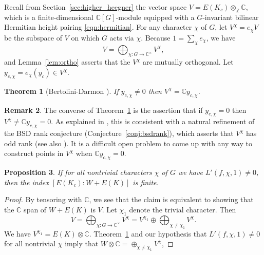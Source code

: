 \documentclass[preprint,12pt]{elsarticle}
\newcommand{\C}{\mathbb{C}}
\newcommand{\Z}{\mathbb{Z}}
\newcommand{\tensor}{\otimes}
\theoremstyle{plain}
\newtheorem{theorem}{Theorem}
\newtheorem{proposition}[theorem]{Proposition}
\theoremstyle{definition}
\newtheorem{remark}[theorem]{Remark}
\begin{document}
Recall from Section~\ref{sec:higher_heegner}
the vector space $V = E(K_c) \tensor_\Z \C$, which is a 
finite-dimensional $\C[G]$-module equipped with a $G$-invariant bilinear
Hermitian height pairing \eqref{eqn:hermitian}.    For any
character $\chi$ of $G$, let $V^{\chi} = e_{\chi} V$ be the subspace
of $V$ on which $G$ acts via $\chi$.  Because $1=\sum_\chi e_\chi$, we have
$$
  V = \bigoplus_{\chi:G\to \C^{\times}} V^{\chi},
$$
and Lemma~\ref{lem:ortho} asserts that the $V^{\chi}$ are mutually orthogonal. 
Let $y_{c,\chi}=e_{\chi}(y_c) \in V^{\chi}$. 

\begin{theorem}[Bertolini-Darmon \cite{bertolini-darmon}]\label{thm:bd}
If $y_{c,\chi} \neq 0$ then $V^{\chi} = \C y_{c,\chi}$.
\end{theorem}

\begin{remark}\label{rmk:converse_bd}
  The converse of Theorem~\ref{thm:bd} is the assertion that if
  $y_{c,\chi}=0$ then $V^{\chi}\neq \C y_{c,\chi}=0$.  As explained in
  \cite{bertolini-darmon}, this is consistent with a natural
  refinement of the BSD rank conjecture
  (Conjecture~\ref{conj:bsdrank}), which asserts that $V^{\chi}$ has
  odd rank (see also \cite[Conj.~1.4.1]{yuan-zhang-zhang_gz}).  It is
  a difficult open problem to come up with any way to construct points
  in $V^\chi$ when $\C y_{c,\chi}=0$.
\end{remark}


\begin{proposition}\label{prop:finite_index}
  If for {\em all} nontrivial characters $\chi$ of $G$ we have
  $L'(f,\chi,1)\neq 0$, then the index $[E(K_c):W+E(K)]$ is finite.
\end{proposition}
\begin{proof}
  By tensoring with $\C$, we see that the claim is equivalent to
  showing that the $\C$ span of $W+E(K)$ is $V$.  
Let $\chi_1$ denote the trivial character. 
Then
$$
  V = \bigoplus_{\chi:G\to \C^{\times}} V^{\chi} = V^{\chi_1} \oplus \bigoplus_{\chi\neq \chi_1} V^{\chi}.
$$
We have $V^{\chi_1} = E(K)\tensor\C$.
Theorem~\ref{thm:bd} and our hypothesis that $L'(f,\chi,1)\neq 0$ for all
nontrivial $\chi$ imply that
$W\tensor\C=\oplus_{\chi\neq \chi_1} V^{\chi}$,
\end{proof}
\end{document}
